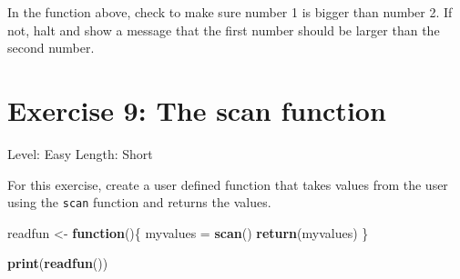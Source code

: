 \documentclass[]{book}
\newenvironment{Shaded}{\begin{snugshade}}{\end{snugshade}}
\newcommand{\ControlFlowTok}[1]{\textcolor[rgb]{0.13,0.29,0.53}{\textbf{#1}}}
\newcommand{\DataTypeTok}[1]{\textcolor[rgb]{0.13,0.29,0.53}{#1}}
\newcommand{\DecValTok}[1]{\textcolor[rgb]{0.00,0.00,0.81}{#1}}
\newcommand{\KeywordTok}[1]{\textcolor[rgb]{0.13,0.29,0.53}{\textbf{#1}}}
\newcommand{\NormalTok}[1]{#1}
\newcommand{\OperatorTok}[1]{\textcolor[rgb]{0.81,0.36,0.00}{\textbf{#1}}}
\newcommand{\StringTok}[1]{\textcolor[rgb]{0.31,0.60,0.02}{#1}}
\begin{document}
In the function above, check to make sure number 1 is bigger than number 2. If not, halt and show a message that the first number should be larger than the second number.

\begin{Shaded}
\end{Shaded}

\hypertarget{exercise-9-the-scan-function}{%
\section*{Exercise 9: The scan function}\label{exercise-9-the-scan-function}}

Level: Easy
Length: Short

For this exercise, create a user defined function that takes values from the user using the \texttt{scan} function and returns the values.

\begin{Shaded}
\begin{Highlighting}[]
\NormalTok{readfun <-}\StringTok{ }\ControlFlowTok{function}\NormalTok{()\{}
\NormalTok{    myvalues =}\StringTok{ }\KeywordTok{scan}\NormalTok{()}
    \KeywordTok{return}\NormalTok{(myvalues)}
\NormalTok{\}}

\KeywordTok{print}\NormalTok{(}\KeywordTok{readfun}\NormalTok{())}
\end{Highlighting}
\end{Shaded}
\end{document}
